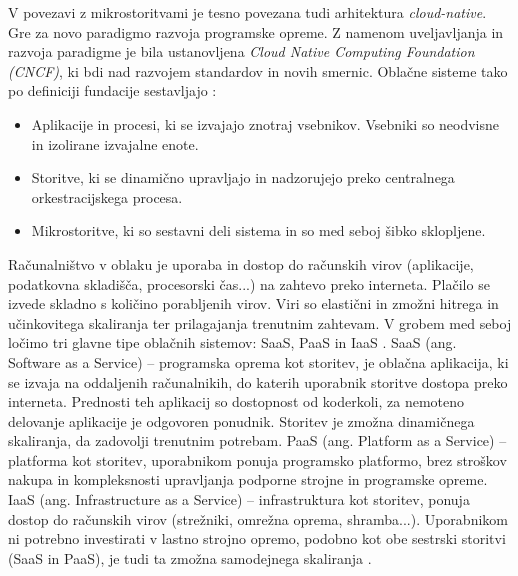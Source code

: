 \documentclass[a4paper, 12pt]{book}
\begin{document}
V povezavi z mikrostoritvami je tesno povezana tudi arhitektura \textit{cloud-native}.
Gre za novo paradigmo razvoja programske opreme.
Z namenom uveljavljanja in razvoja paradigme je bila ustanovljena \textit{Cloud Native Computing Foundation (CNCF)}, ki bdi nad razvojem standardov in novih smernic.
Oblačne sisteme tako po definiciji fundacije sestavljajo \cite{cncf}:
\begin{itemize}
	\item Aplikacije in procesi, ki se izvajajo znotraj vsebnikov. Vsebniki so neodvisne in izolirane izvajalne enote.
	\item Storitve, ki se dinamično upravljajo in nadzorujejo preko centralnega orkestracijskega procesa.
	\item Mikrostoritve, ki so sestavni deli sistema in so med seboj šibko sklopljene.
\end{itemize}

Računalništvo v oblaku je uporaba in dostop do računskih virov (aplikacije, podatkovna skladišča, procesorski čas...) na zahtevo preko interneta.
Plačilo se izvede skladno s količino porabljenih virov.
Viri so elastični in zmožni hitrega in učinkovitega skaliranja ter prilagajanja trenutnim zahtevam.
V grobem med seboj ločimo tri glavne tipe oblačnih sistemov: SaaS, PaaS in IaaS \cite{ibmCloudComputing}.
SaaS (ang. Software as a Service) -- programska oprema kot storitev, je oblačna aplikacija, ki se izvaja na oddaljenih računalnikih, do katerih uporabnik storitve dostopa preko interneta. 
Prednosti teh aplikacij so dostopnost od koderkoli, za nemoteno delovanje aplikacije je odgovoren ponudnik.
Storitev je zmožna dinamičnega skaliranja, da zadovolji trenutnim potrebam.
PaaS (ang. Platform as a Service) -- platforma kot storitev, uporabnikom ponuja programsko platformo, brez stroškov nakupa in kompleksnosti upravljanja podporne strojne in programske opreme.
IaaS (ang. Infrastructure as a Service) -- infrastruktura kot storitev, ponuja dostop do računskih virov (strežniki, omrežna oprema, shramba...).
Uporabnikom ni potrebno investirati v lastno strojno opremo, podobno kot obe sestrski storitvi (SaaS in PaaS), je tudi ta zmožna samodejnega skaliranja \cite{ibmCloudComputing, TOFFETTI2017165O}.
\end{document}
